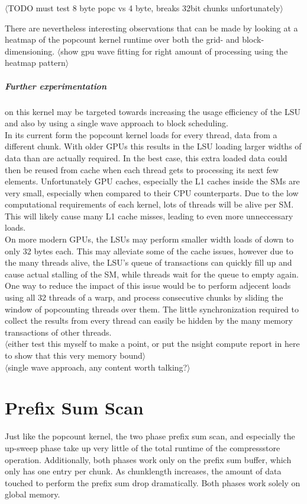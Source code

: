 \documentclass{tudscrreprt}
\newcommand{\markr}[1]{\textcolor{review}{$\langle$#1$\rangle$}}
\begin{document}
			\markr{TODO must test 8 byte popc vs 4 byte, breaks 32bit chunks unfortunately}
			
			There are nevertheless interesting observations that can be made by looking at a heatmap of the popcount kernel runtime over both the grid- and block-dimensioning. \markr{show gpu wave fitting for right amount of processing using the heatmap pattern} \\
			
			\subparagraph{Further experimentation} on this kernel may be targeted towards increasing the usage efficiency of the LSU and also by using a single wave approach to block scheduling. \\
			
			In its current form the popcount kernel loads for every thread, data from a different chunk. With older GPUs this results in the LSU loading larger widths of data than are actually required. In the best case, this extra loaded data could then be reused from cache when each thread gets to processing its next few elements. Unfortunately GPU caches, especially the L1 caches inside the SMs are very small, especially when compared to their CPU counterparts. Due to the low computational requirements of each kernel, lots of threads will be alive per SM. This will likely cause many L1 cache misses, leading to even more unneccessary loads. \\
			On more modern GPUs, the LSUs may perform smaller width loads of down to only 32 bytes each. This may alleviate some of the cache issues, however due to the many threads alive, the LSU's queue of transactions can quickly fill up and cause actual stalling of the SM, while threads wait for the queue to empty again. \\
			One way to reduce the impact of this issue would be to perform adjecent loads using all 32 threads of a warp, and process consecutive chunks by sliding the window of popcounting threads over them. The little synchronization required to collect the results from every thread can easily be hidden by the many memory transactions of other threads. \\
			\markr{either test this myself to make a point, or put the nsight compute report in here to show that this very memory bound} \\
			
			\markr{single wave approach, any content worth talking?}
		
		\section{Prefix Sum Scan}
			Just like the popcount kernel, the two phase prefix sum scan, and especially the up-sweep phase take up very little of the total runtime of the compressstore operation. Additionally, both phases work only on the prefix sum buffer, which only has one entry per chunk. As chunklength increases, the amount of data touched to perform the prefix sum drop dramatically. Both phases work solely on global memory. \\
		
\end{document}
